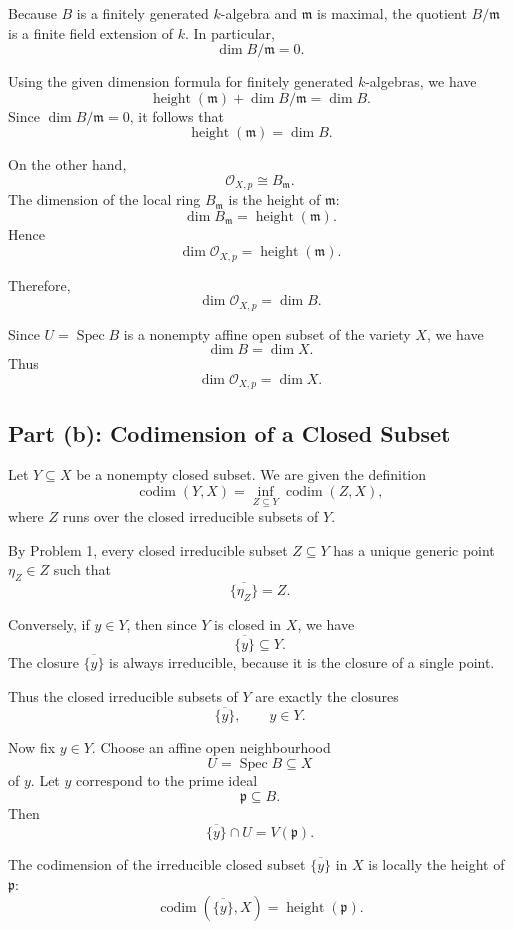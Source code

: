 Because \(B\) is a finitely generated \(k\)-algebra and \(\mathfrak m\) is maximal, the quotient \(B/\mathfrak m\) is a finite field extension of \(k\). In particular,
\[
\dim B/\mathfrak m=0.
\]

Using the given dimension formula for finitely generated \(k\)-algebras, we have
\[
\operatorname{height}(\mathfrak m)+\dim B/\mathfrak m=\dim B.
\]
Since \(\dim B/\mathfrak m=0\), it follows that
\[
\operatorname{height}(\mathfrak m)=\dim B.
\]

On the other hand,
\[
\mathcal O_{X,p}\cong B_{\mathfrak m}.
\]
The dimension of the local ring \(B_{\mathfrak m}\) is the height of \(\mathfrak m\):
\[
\dim B_{\mathfrak m}=\operatorname{height}(\mathfrak m).
\]
Hence
\[
\dim \mathcal O_{X,p}
=
\operatorname{height}(\mathfrak m).
\]

Therefore,
\[
\dim \mathcal O_{X,p}=\dim B.
\]

Since \(U=\operatorname{Spec} B\) is a nonempty affine open subset of the variety \(X\), we have
\[
\dim B=\dim X.
\]
Thus
\[
\boxed{\dim \mathcal O_{X,p}=\dim X.}
\]

\subsection{Part (b): Codimension of a Closed Subset}

Let \(Y\subseteq X\) be a nonempty closed subset. We are given the definition
\[
\operatorname{codim}(Y,X)
=
\inf_{Z\subseteq Y}\operatorname{codim}(Z,X),
\]
where \(Z\) runs over the closed irreducible subsets of \(Y\).

By Problem 1, every closed irreducible subset \(Z\subseteq Y\) has a unique generic point \(\eta_Z\in Z\) such that
\[
\overline{\{\eta_Z\}}=Z.
\]

Conversely, if \(y\in Y\), then since \(Y\) is closed in \(X\), we have
\[
\overline{\{y\}}\subseteq Y.
\]
The closure \(\overline{\{y\}}\) is always irreducible, because it is the closure of a single point.

Thus the closed irreducible subsets of \(Y\) are exactly the closures
\[
\overline{\{y\}},
\qquad y\in Y.
\]

Now fix \(y\in Y\). Choose an affine open neighbourhood
\[
U=\operatorname{Spec} B\subseteq X
\]
of \(y\). Let \(y\) correspond to the prime ideal
\[
\mathfrak p\subseteq B.
\]
Then
\[
\overline{\{y\}}\cap U=V(\mathfrak p).
\]

The codimension of the irreducible closed subset \(\overline{\{y\}}\) in \(X\) is locally the height of \(\mathfrak p\):
\[
\operatorname{codim}(\overline{\{y\}},X)
=
\operatorname{height}(\mathfrak p).
\]

